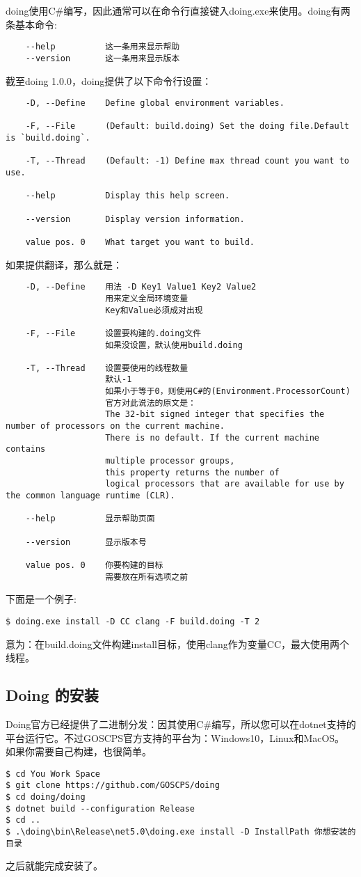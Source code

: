 doing使用C\#编写，因此通常可以在命令行直接键入doing.exe来使用。doing有两条基本命令:\newline{}
\begin{lstlisting}
	--help 			这一条用来显示帮助
	--version 		这一条用来显示版本
\end{lstlisting}
截至doing 1.0.0，doing提供了以下命令行设置：\newline{}
\begin{lstlisting}
	-D, --Define    Define global environment variables.
	
	-F, --File      (Default: build.doing) Set the doing file.Default is `build.doing`.
	
	-T, --Thread    (Default: -1) Define max thread count you want to use.
	
	--help          Display this help screen.
	
	--version       Display version information.
	
	value pos. 0    What target you want to build.
\end{lstlisting}
如果提供翻译，那么就是：\newline{}
\begin{lstlisting}
	-D, --Define    用法 -D Key1 Value1 Key2 Value2
					用来定义全局环境变量
					Key和Value必须成对出现
	
	-F, --File      设置要构建的.doing文件
					如果没设置，默认使用build.doing
	
	-T, --Thread    设置要使用的线程数量
					默认-1
					如果小于等于0，则使用C#的(Environment.ProcessorCount)
					官方对此说法的原文是：
					The 32-bit signed integer that specifies the number of processors on the current machine. 
					There is no default. If the current machine contains 
					multiple processor groups,
					this property returns the number of 
					logical processors that are available for use by the common language runtime (CLR).
	
	--help          显示帮助页面
	
	--version       显示版本号
	
	value pos. 0  	你要构建的目标
					需要放在所有选项之前
\end{lstlisting}
下面是一个例子:
\begin{lstlisting}
$ doing.exe install -D CC clang -F build.doing -T 2
\end{lstlisting}
意为：在build.doing文件构建install目标，使用clang作为变量CC，最大使用两个线程。


\subsection{Doing 的安装}
Doing官方已经提供了二进制分发：因其使用C\#编写，所以您可以在dotnet支持的平台运行它。不过GOSCPS官方支持的平台为：Windows10，Linux和MacOS。
\newline{}
如果你需要自己构建，也很简单。
\begin{lstlisting}
$ cd You Work Space
$ git clone https://github.com/GOSCPS/doing
$ cd doing/doing
$ dotnet build --configuration Release
$ cd ..
$ .\doing\bin\Release\net5.0\doing.exe install -D InstallPath 你想安装的目录
\end{lstlisting}
之后就能完成安装了。




